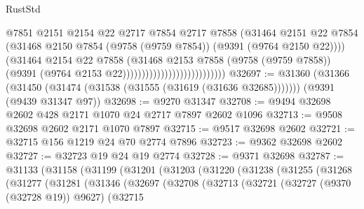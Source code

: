 \begin{lexlean}{RustStd}
\begin{coremodule}
                                                  @7851
                                                  @2151
                                                  @2154
                                                  @22
                                                  @2717
                                                  @7854
                                                  @2717
                                                  @7858
                                                  (@31464
                                                    @2151
                                                    @22
                                                    @7854
                                                    (@31468
                                                      @2150
                                                      @7854
                                                      (@9758 (@9759 @7854))
                                                      (@9391 (@9764 @2150 @22))))
                                                  (@31464
                                                    @2154
                                                    @22
                                                    @7858
                                                    (@31468
                                                      @2153
                                                      @7858
                                                      (@9758 (@9759 @7858))
                                                      (@9391
                                                        (@9764 @2153 @22)))))))))))))))))))))))))))
@32697 := @31360
    (@31366 (@31450 (@31474 (@31538 (@31555 (@31619 (@31636 @32685)))))))
    (@9391 (@9439 @31347 @97))
@32698 := @9270 @31347
@32708 := @9494 @32698 @2602 @428 @2171 @1070 @24 @2717 @7897 @2602 @1096
@32713 := @9508 @32698 @2602 @2171 @1070 @7897
@32715 := @9517 @32698 @2602
@32721 := @32715 @156 @1219 @24 @70 @2774 @7896
@32723 := @9362 @32698 @2602
@32727 := @32723 @19 @24 @19 @2774
@32728 := @9371 @32698
@32787 := @31133
    (@31158
      (@31199
        (@31201
          (@31203
            (@31220
              (@31238
                (@31255
                  (@31268
                    (@31277
                      (@31281
                        (@31346
                          (@32697
                            (@32708
                              (@32713
                                (@32721
                                  (@32727 (@9370 (@32728 @19)) @9627)
                                  (@32715

\end{coremodule}
\end{lexlean}
